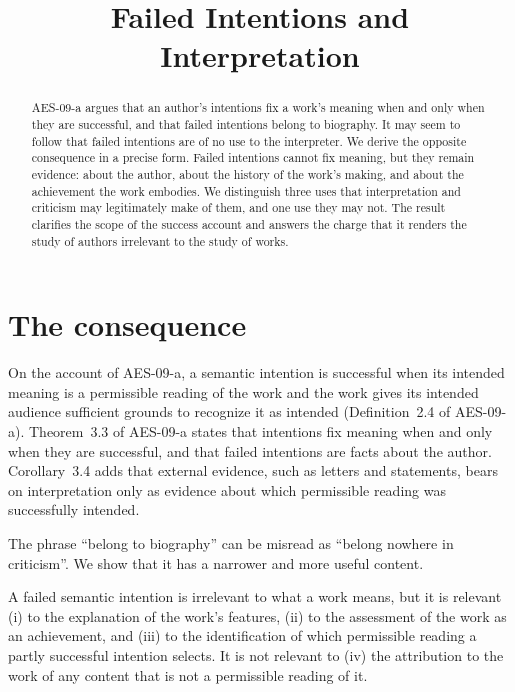 \documentclass{situationist-preprint}
\title{Failed Intentions and Interpretation}
\begin{document}
\maketitle

\begin{abstract}
AES-09-a argues that an author's intentions fix a work's meaning when and only when they are successful, and that failed intentions belong to biography. It may seem to follow that failed intentions are of no use to the interpreter. We derive the opposite consequence in a precise form. Failed intentions cannot fix meaning, but they remain evidence: about the author, about the history of the work's making, and about the achievement the work embodies. We distinguish three uses that interpretation and criticism may legitimately make of them, and one use they may not. The result clarifies the scope of the success account and answers the charge that it renders the study of authors irrelevant to the study of works.
\end{abstract}

\section{The consequence}

On the account of AES-09-a, a semantic intention is successful when its intended meaning is a permissible reading of the work and the work gives its intended audience sufficient grounds to recognize it as intended (Definition~2.4 of AES-09-a). Theorem~3.3 of AES-09-a states that intentions fix meaning when and only when they are successful, and that failed intentions are facts about the author. Corollary~3.4 adds that external evidence, such as letters and statements, bears on interpretation only as evidence about which permissible reading was successfully intended.

The phrase \enquote{belong to biography} can be misread as \enquote{belong nowhere in criticism}. We show that it has a narrower and more useful content.

\begin{proposition}\label{p:uses}
A failed semantic intention is irrelevant to what a work means, but it is relevant (i) to the explanation of the work's features, (ii) to the assessment of the work as an achievement, and (iii) to the identification of which permissible reading a partly successful intention selects. It is not relevant to (iv) the attribution to the work of any content that is not a permissible reading of it.
\end{proposition}
\end{document}
